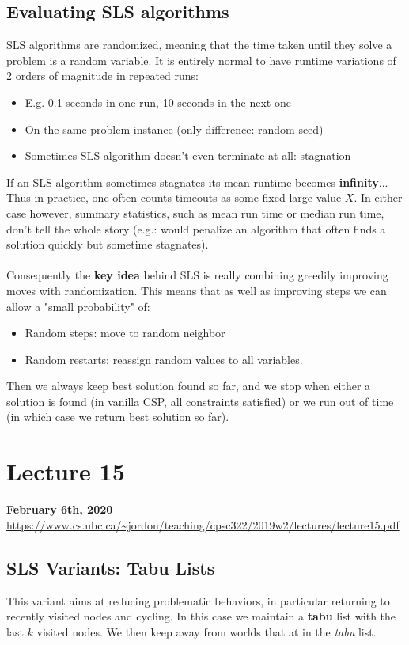 \documentclass{article}
\def\blu#1{{\color{blu}#1}}
\def\red#1{{\color{red}#1}}
\begin{document}
\subsection*{Evaluating SLS algorithms}
SLS algorithms are randomized, meaning that the time taken until they solve a problem is a \red{random variable}. It is entirely normal to have runtime variations of 2 orders of magnitude in repeated runs:
\begin{itemize}
	\item E.g. 0.1 seconds in one run, 10 seconds in the next one
	\item On the same problem instance (only difference: random seed)
	\item Sometimes SLS algorithm doesn’t even terminate at all: stagnation
\end{itemize}
If an SLS algorithm sometimes stagnates its mean runtime becomes \textbf{\red{infinity}}... Thus in practice, one often counts timeouts as some fixed large value $ X $. In either case however, summary statistics, such as mean run time or median run time, don't tell the whole story (e.g.: would penalize an algorithm that often finds a solution quickly but sometime stagnates). \\ \\
Consequently the \textbf{key idea} behind SLS is really combining greedily improving moves with randomization. This means that as well as improving steps we can allow a "small probability" of:
\begin{itemize}
	\item Random steps: move to random neighbor
	\item Random restarts: reassign random values to all variables.
\end{itemize}
Then we always keep best solution found so far, and we stop when either a solution is found (in vanilla CSP, all constraints satisfied) or we run out of time (in which case we return best solution so far).





\newpage

\section*{Lecture 15}
\textbf{February 6th, 2020} \\
\url{https://www.cs.ubc.ca/~jordon/teaching/cpsc322/2019w2/lectures/lecture15.pdf}
	
\subsection*{SLS Variants: Tabu Lists}
This variant aims at reducing problematic behaviors, in particular returning to recently visited nodes and cycling. In this case we maintain a \textbf{\blu{tabu}} list with the last \blu{$ k $} visited nodes. We then keep away from worlds that at in the \textit{tabu} list. 
	
\end{document}
